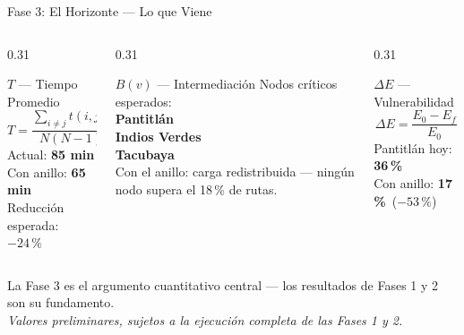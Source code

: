 \begin{frame}{Fase 3: El Horizonte — Lo que Viene}
  \begin{columns}[T]
    \begin{column}{0.31\textwidth}
      \begin{block}{\scriptsize $T$ — Tiempo Promedio}
        \centering
        {\scriptsize\[ T = \frac{\sum_{i \neq j} t(i,j)}{N(N-1)} \]}
        \vspace{-0.2cm}
        {\scriptsize
          Actual: {\color{red!60!black}\bfseries 85 min}\\[0.03cm]
          Con anillo: {\color{green!60!black}\bfseries 65 min}\\[0.03cm]
          Reducción esperada: $-24\,\text{\%}$}
      \end{block}
    \end{column}
    \begin{column}{0.31\textwidth}
      \begin{block}{\scriptsize $B(v)$ — Intermediación}
        \centering
        {\scriptsize Nodos críticos esperados:}\\[0.06cm]
        {\scriptsize\bfseries\color{ColorPrincipal}
          Pantitlán\\[0.02cm]
          Indios Verdes\\[0.02cm]
          Tacubaya}\\[0.1cm]
        {\scriptsize Con el anillo: carga
          redistribuida — ningún nodo
          supera el 18\,\% de rutas.}
      \end{block}
    \end{column}
    \begin{column}{0.31\textwidth}
      \begin{block}{\scriptsize $\Delta E$ — Vulnerabilidad}
        \centering
        {\scriptsize\[ \Delta E = \frac{E_0 - E_f}{E_0} \]}
        \vspace{-0.2cm}
        {\scriptsize
          Pantitlán hoy:
          {\color{red!60!black}\bfseries 36\,\%}\\[0.04cm]
          Con anillo:
          {\color{green!60!black}\bfseries 17\,\%}
          \,($-53\,\text{\%}$)}
      \end{block}
    \end{column}
  \end{columns}
  \vspace{0.15cm}
  {\small\color{ColorPrincipal}
    La Fase 3 es el argumento cuantitativo central —
    los resultados de Fases 1 y 2 son su fundamento.}\\[0.04cm]
  {\tiny\itshape\color{gray!55}
    Valores preliminares, sujetos a la ejecución completa de las Fases 1 y 2.}
\end{frame}
